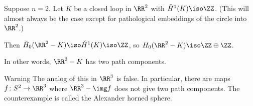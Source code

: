 \documentclass{standalone}
\begin{document}
\begin{example}
  Suppose \(n = 2\).
  Let \(K\) be a closed loop in \(\RR^2\) with \(\check H^1(K) \iso \ZZ\).
  (This will almost always be the case except for pathological embeddings
  of the circle into \(\RR^2\).)

  Then \(\tilde H_0(\RR^2 - K) \iso \check H^1(K) \iso \ZZ\),
  so \(H_0(\RR^2 - K) \iso \ZZ \oplus \ZZ\).

  In other words, \(\RR^2 - K\) has two path components.
\end{example}

\begin{adhoctheorem}{Warning}
  The analog of this in \(\RR^3\) is false.
  In particular, there are maps \(f \colon S^2 \to \RR^3\) where
  \(\RR^3 - \img f\) does not give two path components.
  The counterexample is called the Alexander horned sphere.
\end{adhoctheorem}
\end{document}
